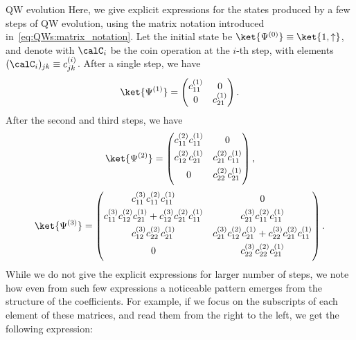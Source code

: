 \begin{examplebox}[label={ex:QWs:bimatrix_notation}]{QW evolution}
\fontsize{10pt}{10pt}\selectfont
    Here, we give explicit expressions for the states produced by a few steps of \ac{QW} evolution, using the matrix notation introduced in~\cref{eq:QWs:matrix_notation}. Let the initial state be $\ket{\Psi^{(0)}}\equiv\ket{1,\uparrow}$, and denote with $\calC_i$ be the coin operation at the $i$-th step, with elements $(\calC_i)_{jk}\equiv c^{(i)}_{jk}$.
    After a single step, we have
    \begin{equation}
        \ket{\Psi^{(1)}} =
        \begin{pmatrix}
            c^{(1)}_{11} & 0 \\
            0 & c^{(1)}_{21}
        \end{pmatrix}.
    \end{equation}
    After the second and third steps, we have
    \begin{equation}
        \ket{\Psi^{(2)}} =
        \begin{pmatrix}
            c^{(2)}_{11} c^{(1)}_{11} & 0 \\[0.4em]
            c^{(2)}_{12} c^{(1)}_{21} & c^{(2)}_{21} c^{(1)}_{11} \\[0.4em]
            0 & c^{(2)}_{22} c^{(1)}_{21} \\[0.4em]
        \end{pmatrix},
    \end{equation}
    \begin{equation}
        \ket{\Psi^{(3)}} =
        \begin{pmatrix}
            c^{(3)}_{11} c^{(2)}_{11} c^{(1)}_{11} & 0 \\[0.4em]
            c^{(3)}_{11} c^{(2)}_{12} c^{(1)}_{21} +
            c^{(3)}_{12} c^{(2)}_{21} c^{(1)}_{11} &
            c^{(3)}_{21} c^{(2)}_{11} c^{(1)}_{11} \\[0.4em]
            c^{(3)}_{12} c^{(2)}_{22} c^{(1)}_{21} &
            c^{(3)}_{21} c^{(2)}_{12} c^{(1)}_{21} +
            c^{(3)}_{22} c^{(2)}_{21} c^{(1)}_{11} \\[0.4em]
            0 & c^{(3)}_{22} c^{(2)}_{22} c^{(1)}_{21} \\[0.4em]
        \end{pmatrix}.
    \end{equation}
    While we do not give the explicit expressions for larger number of steps, we note how even from such few expressions a noticeable pattern emerges from the structure of the coefficients. For example, if we focus on the subscripts of each element of these matrices, and read them from the right to the left, we get the following expression:

\end{examplebox}
